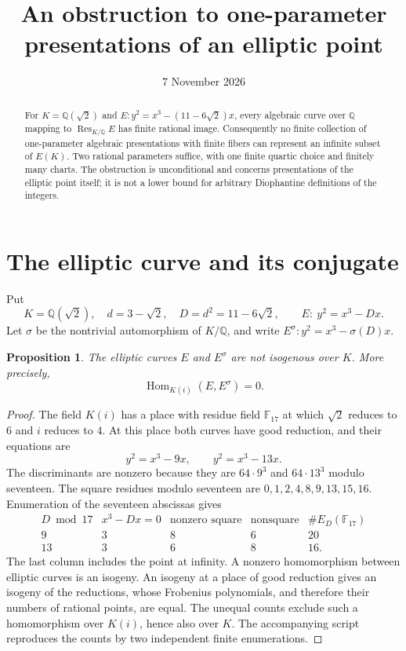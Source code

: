 \documentclass[11pt,a4paper]{article}
\title{An obstruction to one-parameter presentations of an elliptic point}
\author{}\date{7 November 2026}
\newtheorem{proposition}[theorem]{Proposition}
\theoremstyle{definition}\newtheorem{definition}[theorem]{Definition}
\begin{document}
\maketitle
\begin{abstract}
For $K=\mathbb Q(\sqrt2)$ and
$E:y^2=x^3-(11-6\sqrt2)x$, every algebraic curve over
$\mathbb Q$ mapping to $\operatorname{Res}_{K/\mathbb Q}E$
has finite rational image. Consequently no finite collection of
one-parameter algebraic presentations with finite fibers can represent
an infinite subset of $E(K)$. Two rational parameters suffice,
with one finite quartic choice and finitely many charts. The obstruction
is unconditional and concerns presentations of the elliptic point
itself; it is not a lower bound for arbitrary Diophantine definitions
of the integers.
\end{abstract}

\section{The elliptic curve and its conjugate}

Put
\[
 K=\mathbb Q(\sqrt2),\quad d=3-\sqrt2,\quad D=d^2=11-6\sqrt2,
 \qquad E:\ y^2=x^3-Dx.
\]
Let $\sigma$ be the nontrivial automorphism of $K/\mathbb Q$,
and write $E^\sigma:y^2=x^3-\sigma(D)x$.

\begin{proposition}\label{prop:nonisogenous}
The elliptic curves $E$ and $E^\sigma$ are not isogenous over $K$.
More precisely,
\[
                  \operatorname{Hom}_{K(i)}(E,E^\sigma)=0.
\]
\end{proposition}
\begin{proof}
The field $K(i)$ has a place with residue field $\mathbb F_{17}$
at which $\sqrt2$ reduces to $6$ and $i$ reduces to $4$.
At this place both curves have good reduction, and their equations are
\[
                 y^2=x^3-9x,\qquad y^2=x^3-13x.
\]
The discriminants are nonzero because they are $64\cdot9^3$ and
$64\cdot13^3$ modulo seventeen. The square residues modulo seventeen
are $0,1,2,4,8,9,13,15,16$. Enumeration of the seventeen abscissas gives
\[
\begin{array}{c|ccc|c}
D\bmod17 & x^3-Dx=0 & \text{nonzero square} & \text{nonsquare}
         & \#E_D(\mathbb F_{17})\\\hline
9&3&8&6&20\\
13&3&6&8&16.
\end{array}
\]
The last column includes the point at infinity. A nonzero homomorphism
between elliptic curves is an isogeny. An isogeny at a place of good
reduction gives an isogeny of the reductions, whose Frobenius
polynomials, and therefore their numbers of rational points, are equal.
The unequal counts exclude such a homomorphism over $K(i)$, hence
also over $K$. The accompanying script reproduces the counts by two
independent finite enumerations.
\end{proof}
\end{document}
